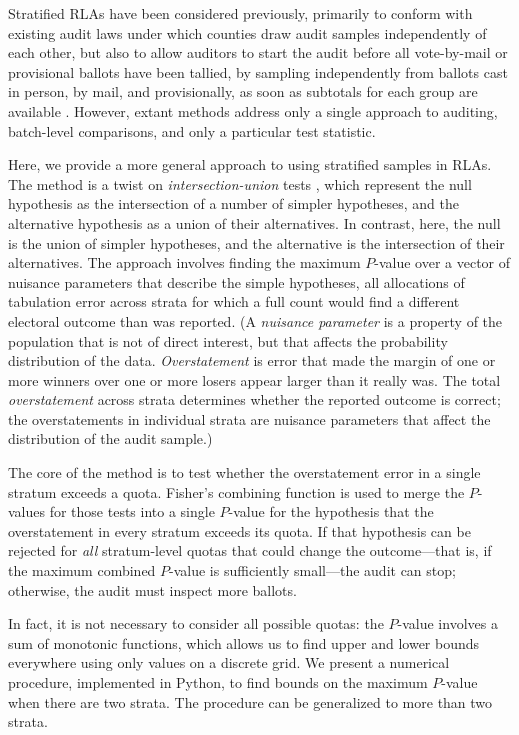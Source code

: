 \documentclass[runningheads]{llncs}
\begin{document}
Stratified RLAs have been considered previously, primarily to conform with existing audit laws under which counties draw audit samples independently of each other, but also to allow auditors to start the audit before all vote-by-mail or provisional ballots have been tallied, by sampling independently from ballots cast in person, by mail, and provisionally, as soon as subtotals for each group are available \cite{stark08a,higginsEtal11}.
However, extant methods address only a single approach to auditing, batch-level comparisons, and only a particular test statistic.

Here, we provide a more general approach to using stratified samples in RLAs.
The method is a twist on \emph{intersection-union} tests \cite{pesarinSalmaso10}, which represent the null hypothesis
as the intersection of a number of simpler hypotheses, and the alternative hypothesis as a union of their alternatives.
In contrast, here, the null is the union of simpler hypotheses, and the alternative is the intersection of their alternatives.
The approach involves finding the maximum $P$-value over a vector of nuisance parameters that describe the simple hypotheses, 
all allocations of tabulation error across strata for which a full count would find a different electoral outcome than was reported.
(A \emph{nuisance parameter} is a property of the population that is not of direct interest, but that affects the probability distribution of the data. 
\emph{Overstatement} is error that made the margin of one or more winners over one or more losers appear larger than it really was.
The total \emph{overstatement} across strata determines whether the reported outcome is correct; 
the overstatements in individual strata are nuisance parameters that affect the distribution of the audit sample.)

The core of the method is to test whether the overstatement error in a single stratum exceeds a quota.
Fisher's combining function is used to merge the $P$-values for those tests into a single $P$-value for the hypothesis that the overstatement in every stratum exceeds its quota.
If that hypothesis can be rejected for \emph{all} stratum-level quotas that could change the outcome---that is, if the maximum combined $P$-value is sufficiently small---the audit can stop; otherwise, the audit must inspect more ballots.

In fact, it is not necessary to consider all possible quotas: the $P$-value involves a sum of monotonic functions, which allows us to find upper and lower bounds everywhere using only values on a discrete grid.
We present a numerical procedure, implemented in Python,
to find bounds on the maximum $P$-value when there are two strata.
The procedure can be generalized to more than two strata.
\end{document}
